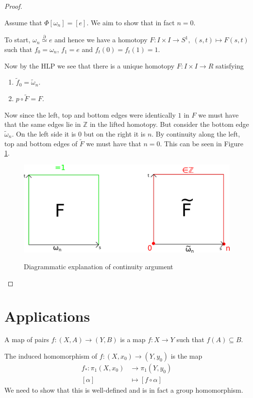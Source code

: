 \documentclass[11pt]{article}
\newcommand{\homrel}{\stackrel{\partial}{\simeq}}
\newcommand{\Z}{\mathbb{Z}}
\newenvironment{defin}
	{\begin{mdframed}[backgroundcolor=white, roundcorner=5pt, linewidth=1pt]
		\setlength{\parindent}{0pt}
		}
	{\end{mdframed}}
\newcommand{\mdf}[1]{{\color{red} #1}}
\begin{document}
\begin{proof}
\begin{itemize}
		Assume that $\Phi[\omega_n]=[e]$.
		We aim to show that in fact $n=0$.

		To start, $\omega_n\homrel e$ and hence we have a homotopy $F:I\times I\to S^1,\;(s, t)\mapsto F(s, t)$ such that $f_0=\omega_n$, $f_1=e$ and $f_t(0)=f_t(1)=1$.

		Now by the HLP we see that there is a unique homotopy $F:I\times I \to R$ satisfying
		\begin{enumerate}[label=(\roman*)]
			\item $\widetilde{f}_0=\widetilde{\omega}_n$.
			\item $p\circ \widetilde{F}=F$.
		\end{enumerate}

		Now since the left, top and bottom edges were identically $1$ in $F$ we must have that the same edges lie in $\Z$ in the lifted homotopy.
		But consider the bottom edge $\widetilde{\omega}_n$.
		On the left side it is $0$ but on the right it is $n$.
		By continuity along the left, top and bottom edges of $\widetilde{F}$ we must have that $n=0$.
		This can be seen in Figure \ref{fig:circlepi1}.
		\begin{figure}[ht]
			\centering
			\includegraphics{circlepi1.png}
			\label{fig:circlepi1}
			\caption{Diagrammatic explanation of continuity argument}
		\end{figure}	
\end{itemize}
\end{proof}

\section{Applications}
\begin{defin}
	A \mdf{map of pairs} $f:(X,A)\to(Y, B)$ is a map $f:X\to Y$ such that $f(A)\subseteq B$.	

	The \mdf{induced homomorphism} of $f:(X, x_0)\to (Y, y_0)$ is the map
	\begin{align*}	
		f_\ast:\pi_1(X, x_0)&\to \pi_1(Y,y_0)\\
		[\alpha] &\mapsto [f \circ \alpha]
	\end{align*}
	We need to show that this is well-defined and is in fact a group homomorphism.
\end{defin}
\end{document}
